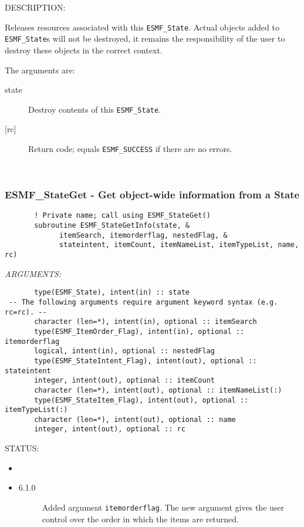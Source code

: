 {\sf DESCRIPTION:\\ }


   Releases resources associated with this {\tt ESMF\_State}. Actual
   objects added to {\tt ESMF\_State}s will not be destroyed, it
   remains the responsibility of the user to destroy these objects in the correct
   context.
  
   The arguments are:
   \begin{description}
   \item[state]
   Destroy contents of this {\tt ESMF\_State}.
   \item[{[rc]}]
   Return code; equals {\tt ESMF\_SUCCESS} if there are no errors.
   \end{description}
   
 
\mbox{}\hrulefill\ 
 
\subsubsection [ESMF\_StateGet] {ESMF\_StateGet - Get object-wide information from a State}


  
\begin{verbatim}       ! Private name; call using ESMF_StateGet()
       subroutine ESMF_StateGetInfo(state, &
             itemSearch, itemorderflag, nestedFlag, &
             stateintent, itemCount, itemNameList, itemTypeList, name, rc)\end{verbatim}{\em ARGUMENTS:}
\begin{verbatim}       type(ESMF_State), intent(in) :: state
 -- The following arguments require argument keyword syntax (e.g. rc=rc). --
       character (len=*), intent(in), optional :: itemSearch
       type(ESMF_ItemOrder_Flag), intent(in), optional :: itemorderflag
       logical, intent(in), optional :: nestedFlag
       type(ESMF_StateIntent_Flag), intent(out), optional :: stateintent
       integer, intent(out), optional :: itemCount
       character (len=*), intent(out), optional :: itemNameList(:)
       type(ESMF_StateItem_Flag), intent(out), optional :: itemTypeList(:)
       character (len=*), intent(out), optional :: name
       integer, intent(out), optional :: rc\end{verbatim}
{\sf STATUS:}
   \begin{itemize}
   \item{}
   \item{}
   \begin{description}
   \item[6.1.0] Added argument {\tt itemorderflag}.
   The new argument gives the user control over the order in which
   the items are returned.
   \end{description}
   \end{itemize}
  
